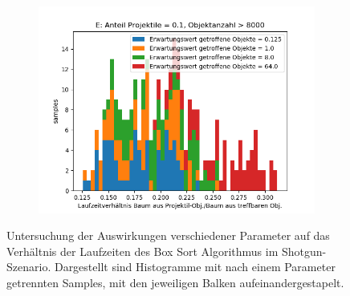 \begin{figure}
\begin{subfigure}[t]{0.55\textwidth}
		\label{fig:boxsortChoice-shotgun-D}
	\end{subfigure}
~
	\begin{subfigure}[t]{0.55\textwidth}
		\centering
		\includegraphics[width=1\textwidth]{./res/boxsortChoice-shotgun-E.png}

		\label{fig:boxsortChoice-shotgun-E}
	\end{subfigure}


	\caption{Untersuchung der Auswirkungen verschiedener Parameter auf das Verhältnis der Laufzeiten des Box Sort Algorithmus im Shotgun-Szenario. Dargestellt sind Histogramme mit nach einem Parameter getrennten Samples, mit den jeweiligen Balken aufeinandergestapelt.}
	\label{fig:boxsortChoice-shotgun}
\end{figure}



